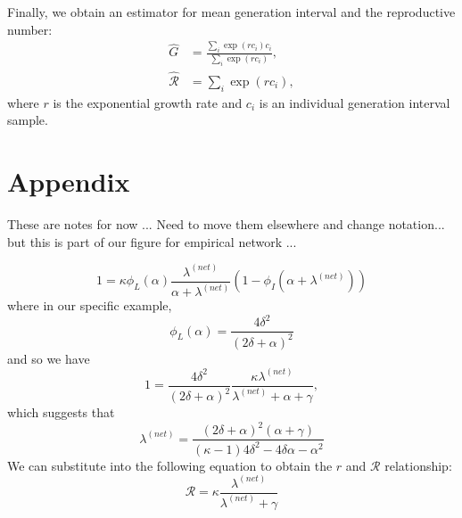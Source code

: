 \documentclass[12pt]{article}
\newcommand{\RR}{\ensuremath{{\mathcal R}}}
\begin{document}
Finally, we obtain an estimator for mean generation interval and the reproductive number:
\begin{equation}
\begin{aligned}
\hat{G} &= \frac{\sum_{i} \exp(r c_i) c_i}{\sum_{i} \exp(r c_i)},\\
\hat{\RR} &= \sum_{i} \exp(r c_i),
\end{aligned}
\end{equation}
where $r$ is the exponential growth rate and $c_i$ is an individual generation interval sample.

\section{Appendix}

These are notes for now ... Need to move them elsewhere and change notation... but this is part of our figure for empirical network ...

$$
1 = \kappa \phi_L(\alpha) \frac{\lambda^{(net)}}{\alpha + \lambda^{(net)}} (1 - \phi_I(\alpha+\lambda^{(net)}))
$$
where in our specific example,
$$
\phi_L(\alpha) = \frac{4 \delta^2}{(2 \delta + \alpha)^2}
$$
and so we have
$$
1 = \frac{4 \delta^2}{(2 \delta + \alpha)^2} \frac{\kappa \lambda^{(net)}}{\lambda^{(net)} + \alpha + \gamma},
$$
which suggests that
$$
\lambda^{(net)} = \frac{(2\delta + \alpha)^2 (\alpha + \gamma)}{(\kappa - 1) 4 \delta^2 - 4 \delta \alpha - \alpha^2}
$$
We can substitute into the following equation to obtain the $r$ and $\RR$ relationship:
$$
\RR = \kappa \frac{\lambda^{(net)}}{\lambda^{(net)} + \gamma}
$$


\end{document}
